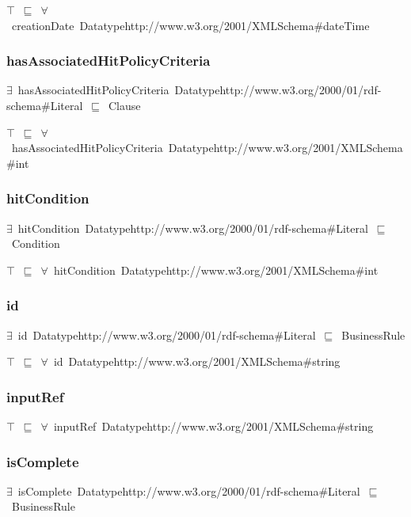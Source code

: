 \documentclass{article}
\begin{document}
\ensuremath{\top}~\ensuremath{\sqsubseteq}~\ensuremath{\forall}~creationDate~Datatypehttp://www.w3.org/2001/XMLSchema#dateTime

\subsubsection*{hasAssociatedHitPolicyCriteria}

\ensuremath{\exists}~hasAssociatedHitPolicyCriteria~Datatypehttp://www.w3.org/2000/01/rdf-schema#Literal~\ensuremath{\sqsubseteq}~Clause

\ensuremath{\top}~\ensuremath{\sqsubseteq}~\ensuremath{\forall}~hasAssociatedHitPolicyCriteria~Datatypehttp://www.w3.org/2001/XMLSchema#int

\subsubsection*{hitCondition}

\ensuremath{\exists}~hitCondition~Datatypehttp://www.w3.org/2000/01/rdf-schema#Literal~\ensuremath{\sqsubseteq}~Condition

\ensuremath{\top}~\ensuremath{\sqsubseteq}~\ensuremath{\forall}~hitCondition~Datatypehttp://www.w3.org/2001/XMLSchema#int

\subsubsection*{id}

\ensuremath{\exists}~id~Datatypehttp://www.w3.org/2000/01/rdf-schema#Literal~\ensuremath{\sqsubseteq}~BusinessRule

\ensuremath{\top}~\ensuremath{\sqsubseteq}~\ensuremath{\forall}~id~Datatypehttp://www.w3.org/2001/XMLSchema#string

\subsubsection*{inputRef}

\ensuremath{\top}~\ensuremath{\sqsubseteq}~\ensuremath{\forall}~inputRef~Datatypehttp://www.w3.org/2001/XMLSchema#string

\subsubsection*{isComplete}

\ensuremath{\exists}~isComplete~Datatypehttp://www.w3.org/2000/01/rdf-schema#Literal~\ensuremath{\sqsubseteq}~BusinessRule
\end{document}

